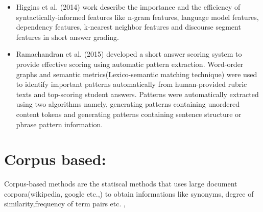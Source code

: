 \documentclass[rnd]{mas_proposal}
\begin{document}
\begin{itemize}
	\item Higgins et al. (2014) \cite{Higgins2014} work describe the importance and the efficiency of syntactically-informed features like n-gram features, language model features, dependency features, k-nearest neighbor features and discourse segment features in short answer grading.
    \item Ramachandran et al. (2015) \cite{Ramachandran2015} developed a short answer scoring system to provide effective scoring using automatic pattern extraction. Word-order graphs and semantic metrics(Lexico-semantic matching technique) were used to identify important patterns automatically from human-provided rubric texts and top-scoring student answers. Patterns were automatically extracted using two algorithms namely, generating patterns containing unordered content tokens and generating patterns containing sentence structure or phrase pattern information.
    
\end{itemize}

\section{Corpus based:}

Corpus-based methods are the statiscal methods that uses large document corpora(wikipedia, google etc.,) to obtain informations like synonyms, degree of similarity,frequency of term pairs etc. \cite{Burrows2015},
\end{document}
